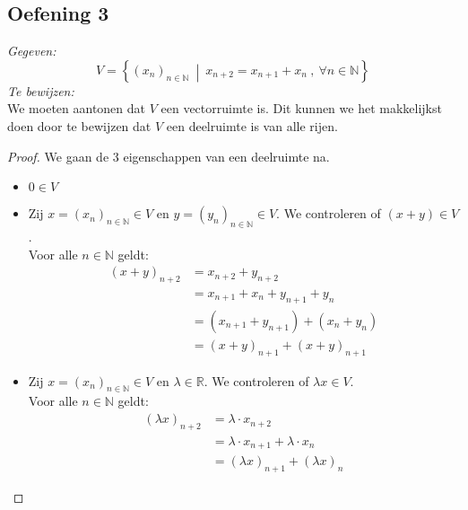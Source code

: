 \documentclass[lineaire_algebra_oplossingen.tex]{subfiles}
\begin{document}
\subsection{Oefening 3}%
\textit{Gegeven:}
\[
V = \left\{ (x_n)_{n \in \mathbb{N}} \ \middle|\ x_{n+2} = x_{n+1} + x_n \ ,\ \forall n \in \mathbb{N} \right\}
\]
\textit{Te bewijzen:}\\
We moeten aantonen dat $V$ een vectorruimte is. Dit kunnen we het makkelijkst doen door te bewijzen dat $V$ een deelruimte is van alle rijen.
\begin{proof}
We gaan de 3 eigenschappen van een deelruimte na.
\begin{itemize}
\item $0 \in V$
\item Zij $x = (x_n)_{n \in \mathbb{N}} \in V$ en $y = (y_n)_{n \in \mathbb{N}} \in V$. We controleren of $(x+y) \in V$.\\
Voor alle $n \in \mathbb{N}$ geldt:
\begin{align*}
(x+y)_{n+2}
&= x_{n+2} + y_{n+2} \\
&= x_{n+1} + x_n + y_{n+1} + y_n \\
&= (x_{n+1} + y_{n+1}) + (x_n + y_n) \\
&= (x+y)_{n+1} + (x+y)_{n+1}
\end{align*}
\item Zij $x = (x_n)_{n \in \mathbb{N}} \in V$ en $\lambda \in \mathbb{R}$. We controleren of $\lambda x \in V$.\\
Voor alle $n \in \mathbb{N}$ geldt:
\begin{align*}
(\lambda x)_{n+2}
&= \lambda \cdot x_{n+2} \\
&= \lambda \cdot x_{n+1} + \lambda \cdot x_n \\
&= (\lambda x)_{n+1} + (\lambda x)_n
\end{align*}
\end{itemize}
\end{proof}
\end{document}
